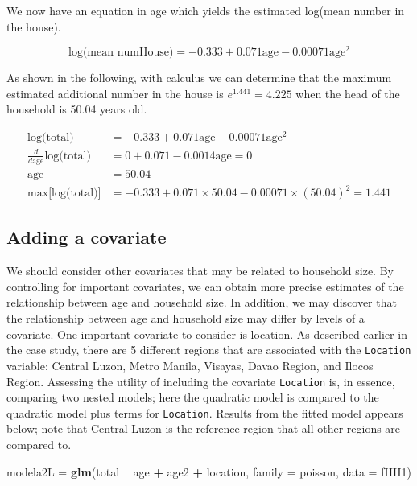 \documentclass[
]{krantz}
\newenvironment{Shaded}{\begin{snugshade}}{\end{snugshade}}
\newcommand{\DataTypeTok}[1]{\textcolor[rgb]{0.27,0.27,0.27}{#1}}
\newcommand{\KeywordTok}[1]{\textcolor[rgb]{0.27,0.27,0.27}{\textbf{#1}}}
\newcommand{\NormalTok}[1]{#1}
\newcommand{\OperatorTok}[1]{\textcolor[rgb]{0.43,0.43,0.43}{\textbf{#1}}}
\newcommand{\StringTok}[1]{\textcolor[rgb]{0.5,0.5,0.5}{#1}}
\begin{document}
We now have an equation in age which yields the estimated log(mean number in the house).

\[\textrm{log(mean numHouse)} =  -0.333 + 0.071 \textrm{age} - 0.00071 \textrm{age}^2\]

As shown in the following, with calculus we can determine that the maximum estimated additional number in the house is \(e^{1.441} = 4.225\) when the head of the household is 50.04 years old.

\begin{align*}
\textrm{log(total)} & = -0.333 + 0.071\textrm{age} - 0.00071 \textrm{age}^2 \\
\frac{d}{d\textrm{age}}\textrm{log(total)} & = 0 + 0.071 - 0.0014 \textrm{age} = 0 \\
\textrm{age} & = 50.04 \\
\textrm{max[log(total)]} & = -0.333 + 0.071 \times 50.04 - 0.00071 \times (50.04)^2 = 1.441
\end{align*}

\hypertarget{adding-a-covariate}{%
\subsection{Adding a covariate}\label{adding-a-covariate}}

We should consider other covariates that may be related to household size. By controlling for important covariates, we can obtain more precise estimates of the relationship between age and household size. In addition, we may discover that the relationship between age and household size may differ by levels of a covariate. One important covariate to consider is location. As described earlier in the case study, there are 5 different regions that are associated with the \texttt{Location} variable: Central Luzon, Metro Manila, Visayas, Davao Region, and Ilocos Region. Assessing the utility of including the covariate \texttt{Location} is, in essence, comparing two nested models; here the quadratic model is compared to the quadratic model plus terms for \texttt{Location}. Results from the fitted model appears below; note that Central Luzon is the reference region that all other regions are compared to.

\begin{Shaded}
\begin{Highlighting}[]
\NormalTok{modela2L =}\StringTok{ }\KeywordTok{glm}\NormalTok{(total }\OperatorTok{~}\StringTok{ }\NormalTok{age }\OperatorTok{+}\StringTok{ }\NormalTok{age2 }\OperatorTok{+}\StringTok{ }\NormalTok{location, }
               \DataTypeTok{family =}\NormalTok{ poisson, }\DataTypeTok{data =}\NormalTok{ fHH1)}
\end{Highlighting}
\end{Shaded}
\end{document}
